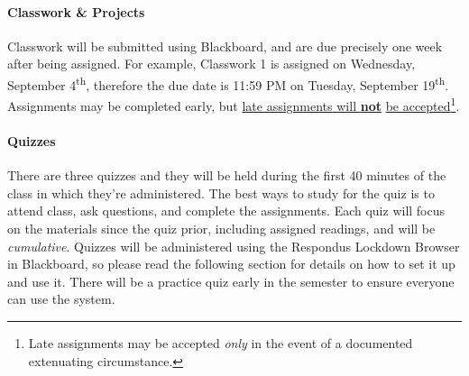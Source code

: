 \documentclass[letter,10pt]{article}
\begin{document}
\label{sec:cwhw}
\paragraph{Classwork \& Projects}Classwork will be submitted using Blackboard, and are due precisely one week after being assigned. For example, Classwork 1 is assigned on Wednesday, September 4\textsuperscript{th}, therefore the due date is 11:59 PM on Tuesday, September 19\textsuperscript{th}. Assignments may be completed early, but \underline{\hypertarget{sec:cwhw}{late assignments} will \textbf{not}} \underline{be accepted}\footnote{Late assignments may be accepted \textit{only} in the event of a documented extenuating circumstance.}.

\paragraph{Quizzes}There are three quizzes and they will be held during the first 40 minutes of the class in which they're administered. The best ways to study for the quiz is to attend class, ask questions, and complete the assignments. Each quiz will focus on the materials since the quiz prior, including assigned readings, and will be \textit{cumulative}. Quizzes will be administered using the Respondus Lockdown Browser in Blackboard, so please read the following section for details on how to set it up and use it. There will be a practice quiz early in the semester to ensure everyone can use the system.
\end{document}
